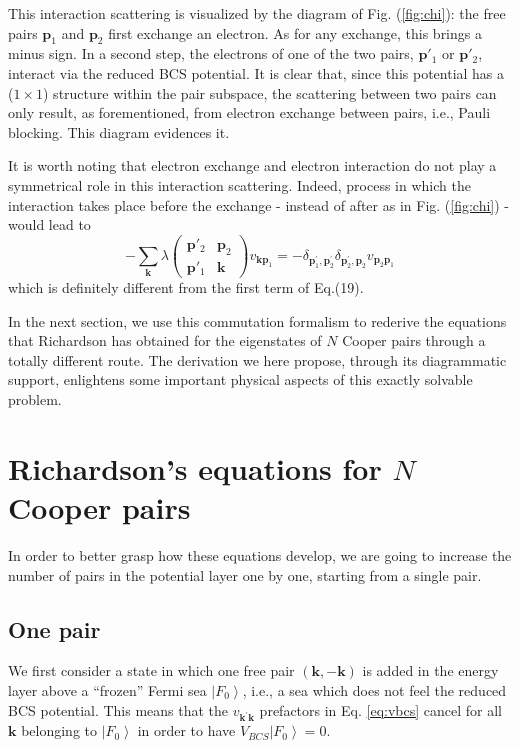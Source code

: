 \documentclass[epj]{svjour}
\newcommand{\vk}{\ensuremath{\mathbf{k}}}
\newcommand{\vp}{\ensuremath{\mathbf{p}}}
\begin{document}
This interaction scattering is visualized by the diagram of Fig. (\ref{fig:chi}): the free pairs $\mathbf{p}_1$ and $\mathbf{p}_2$ first
exchange an electron. As for any exchange, this brings a minus sign. In a
second step, the electrons of one of the two pairs, $\mathbf{p}' _1$ or ${\mathbf{p}}' _2$,  interact via the reduced BCS
potential. It is clear that, since this potential has a ($1\times1$)
structure within the pair subspace, the scattering between two pairs can only result, as forementioned, from
electron exchange between pairs, i.e., Pauli blocking. This diagram evidences it.

It is worth noting that electron exchange and electron interaction do not play a symmetrical role in this interaction scattering. Indeed, process in which the interaction takes place before the exchange - instead of after as in Fig. (\ref{fig:chi}) - would lead to
\begin{equation}
-\sum_\vk \lambda\left(%
\begin{smallmatrix}\vp'_2&\vp_2\\\vp'_1&\mathbf{k}\end{smallmatrix}\right)v_{\mathbf{k}\mathbf{p} _1 } =-\delta_{\mathbf{p}
^{\prime}_1,\mathbf{p}^{\prime} _2}\delta_{\mathbf{p}
^{\prime}_2,\mathbf{p} _2}v_{\mathbf{p} _2\mathbf{p} _1}
\end{equation}
which is definitely different from the first term of Eq.(19).

In the next section, we use this commutation formalism to rederive the equations that Richardson has obtained for the eigenstates of $N$ Cooper pairs through a totally different route. The  derivation we here propose, through its diagrammatic support, enlightens some important physical aspects of this exactly solvable problem.

\section{Richardson's equations for $N$ Cooper pairs\label{sec:rich}}

In order to better grasp how these equations develop, we are going to increase the number of pairs in the potential layer one by one, starting from a single pair.

\subsection{One pair}

We first consider a state in which one free pair $(\mathbf{k} ,-\mathbf{k} )$ is added in the energy layer above a
``frozen'' Fermi sea $\left|F_0\right> $, i.e., a sea which does not feel the reduced BCS potential.
This means that the $v_{\mathbf{k} ^{\prime}\mathbf{k} }$ prefactors in Eq.%
\eqref{eq:vbcs} cancel for all $\mathbf{k} $ belonging to $\left|F_0\right> $ in order to have $V_{BCS} \left|F_0\right>=0$.
\end{document}
